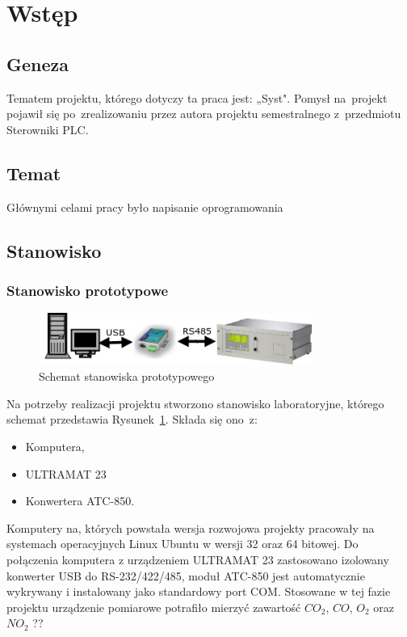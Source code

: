 \section{Wstęp}

\subsection{Geneza}
Tematem projektu, którego dotyczy ta praca jest: „Syst". Pomysł na~projekt pojawił się po~zrealizowaniu przez autora projektu semestralnego z~przedmiotu Sterowniki PLC.

\subsection{Temat}
Głównymi celami pracy było napisanie oprogramowania

\subsection{Stanowisko}
\subsubsection{Stanowisko prototypowe}
\begin{figure}[!htb] 	\centering 	\includegraphics[width=0.8\textwidth]{images/schemat1} 	\caption{Schemat stanowiska prototypowego} \label{schemat1} \end{figure} 
Na potrzeby realizacji projektu stworzono stanowisko laboratoryjne, którego schemat przedstawia Rysunek~\ref{schemat1}. Składa się ono~z:
\begin{itemize}
\item Komputera,
\item ULTRAMAT 23
\item Konwertera ATC-850.
\end{itemize}
\indent
\indent Komputery na, których powstała wersja rozwojowa projekty pracowały na systemach operacyjnych Linux Ubuntu w wersji 32 oraz 64 bitowej. Do połączenia komputera z urządzeniem ULTRAMAT 23 zastosowano izolowany konwerter USB do RS-232/422/485, moduł ATC-850 jest automatycznie wykrywany i instalowany jako standardowy port COM. Stosowane w tej fazie projektu urządzenie pomiarowe potrafiło mierzyć zawartość $ CO_2 $, $ CO $, $ O_2 $ oraz $ NO_2 $ ??

